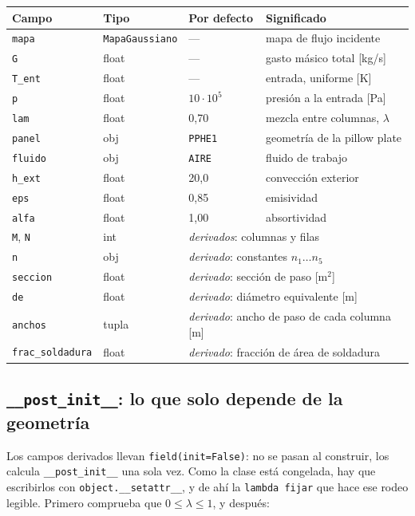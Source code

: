 \documentclass[11pt,a4paper]{article}
\begin{document}
\begin{center}
\begin{tabular}{llll}
  \toprule
  Campo & Tipo & Por defecto & Significado \\
  \midrule
  \texttt{mapa}   & \texttt{MapaGaussiano} & --- & mapa de flujo incidente \\
  \texttt{G}      & float & --- & gasto másico total [kg/s] \\
  \texttt{T\_ent} & float & --- & entrada, uniforme [K] \\
  \texttt{p}      & float & $10\cdot10^5$ & presión a la entrada [Pa] \\
  \texttt{lam}    & float & 0,70 & mezcla entre columnas, $\lambda$ \\
  \texttt{panel}  & obj   & \texttt{PPHE1} & geometría de la pillow plate \\
  \texttt{fluido} & obj   & \texttt{AIRE}  & fluido de trabajo \\
  \texttt{h\_ext} & float & 20,0 & convección exterior \\
  \texttt{eps}    & float & 0,85 & emisividad \\
  \texttt{alfa}   & float & 1,00 & absortividad \\
  \midrule
  \texttt{M}, \texttt{N}    & int   & \multicolumn{2}{l}{\emph{derivados}: columnas y filas} \\
  \texttt{n}                & obj   & \multicolumn{2}{l}{\emph{derivado}: constantes $n_1\ldots n_5$} \\
  \texttt{seccion}          & float & \multicolumn{2}{l}{\emph{derivado}: sección de paso [m$^2$]} \\
  \texttt{de}               & float & \multicolumn{2}{l}{\emph{derivado}: diámetro equivalente [m]} \\
  \texttt{anchos}           & tupla & \multicolumn{2}{l}{\emph{derivado}: ancho de paso de cada columna [m]} \\
  \texttt{frac\_soldadura}  & float & \multicolumn{2}{l}{\emph{derivado}: fracción de área de soldadura} \\
  \bottomrule
\end{tabular}
\end{center}

\subsection{\texttt{\_\_post\_init\_\_}: lo que solo depende de la geometría}

Los campos derivados llevan \texttt{field(init=False)}: no se pasan al
construir, los calcula \texttt{\_\_post\_init\_\_} una sola vez. Como la clase
está congelada, hay que escribirlos con \texttt{object.\_\_setattr\_\_}, y de ahí
la \texttt{lambda fijar} que hace ese rodeo legible. Primero comprueba que
$0 \le \lambda \le 1$, y después:
\end{document}
